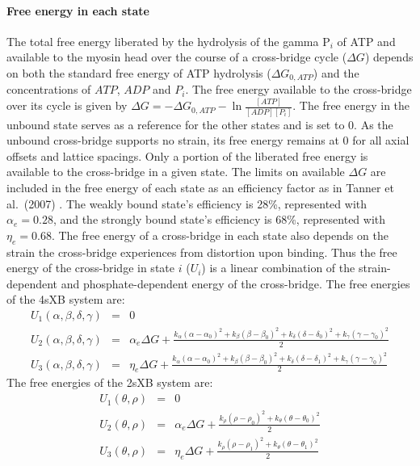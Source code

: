 \documentclass[10pt]{article}
\newcommand{\citep}[1]{\cite{#1}} %
\begin{document}
\paragraph{Free energy in each state} %
The total free energy liberated by the hydrolysis of the gamma P$_i$ of ATP and available to the myosin head over the course of a cross-bridge cycle ($\Delta G$) depends on both the standard free energy of ATP hydrolysis ($\Delta G_{0,ATP}$) and the concentrations of $ATP$, $ADP$ and $P_i$. 
The free energy available to the cross-bridge over its cycle is given by $\Delta G = -\Delta G_{0,ATP} - \ln \frac{[ATP]}{[ADP] [P_i]}$. 
The free energy in the unbound state serves as a reference for the other states and is set to 0. 
As the unbound cross-bridge supports no strain, its free energy remains at 0 for all axial offsets and lattice spacings. 
Only a portion of the liberated free energy is available to the cross-bridge in a given state.
The limits on available $\Delta G$ are included in the free energy of each state as an efficiency factor as in Tanner et al.~(2007) \citep{Pate1989, Tanner2007} .
The weakly bound state's efficiency is 28\%, represented with $\alpha_e=0.28$, and the strongly bound state's efficiency is 68\%, represented with $\eta_e=0.68$. 
The free energy of a cross-bridge in each state also depends on the strain the cross-bridge experiences from distortion upon binding.
Thus the free energy of the cross-bridge in state $i$ ($U_i$) is a linear combination of the strain-dependent and phosphate-dependent energy of the cross-bridge.
The free energies of the 4sXB system are: 
\begin{eqnarray*}
\label{4sEnergy}
U_1(\alpha, \beta, \delta, \gamma) & = & 0 \\
U_2(\alpha, \beta, \delta, \gamma) & = & \alpha_e \Delta G + \frac{k_\alpha (\alpha-\alpha_0)^2 + k_\beta (\beta-\beta_0)^2 + k_\delta (\delta-\delta_0)^2 + k_\gamma (\gamma-\gamma_0)^2}{2} \\
U_3(\alpha, \beta, \delta, \gamma) & = & \eta_e \Delta G + \frac{k_\alpha (\alpha-\alpha_0)^2 + k_\beta (\beta-\beta_0)^2 + k_\delta (\delta-\delta_1)^2 + k_\gamma (\gamma-\gamma_0)^2}{2} 
\end{eqnarray*}
The free energies of the 2sXB system are: 
\begin{eqnarray*}
\label{2sEnergy}
	U_1(\theta, \rho) & = & 0 \\
    U_2(\theta, \rho) & = & \alpha_e \Delta G + \frac{k_\rho (\rho - \rho_0)^2 + 
                          k_\theta (\theta - \theta_0)^2}{2} \\
    U_3(\theta, \rho) & = & \eta_e \Delta G   + \frac{k_\rho (\rho - \rho_1)^2 + 
                          k_\theta (\theta - \theta_1)^2}{2} 
\end{eqnarray*}
\end{document}
